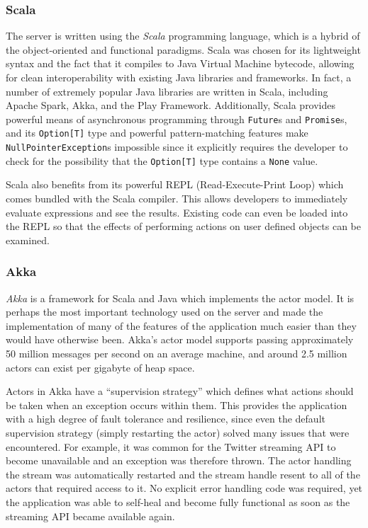 \documentclass{l4proj}
\newcommand{\code}[1]{\texttt{#1}}
\begin{document}
        \subsubsection{Scala}
        The server is written using the \textit{Scala} programming language, which is a hybrid of the object-oriented and functional paradigms. Scala was chosen for its lightweight syntax and the fact that it compiles to Java Virtual Machine bytecode, allowing for clean interoperability with existing Java libraries and frameworks. In fact, a number of extremely popular Java libraries are written in Scala, including Apache Spark, Akka, and the Play Framework. Additionally, Scala provides powerful means of asynchronous programming through \code{Future}s and \code{Promise}s, and its \code{Option[T]} type and powerful pattern-matching features make \code{NullPointerException}s impossible since it explicitly requires the developer to check for the possibility that the \code{Option[T]} type contains a \code{None} value.
        
Scala also benefits from its powerful REPL (Read-Execute-Print Loop) which comes bundled with the Scala compiler. This allows developers to immediately evaluate expressions and see the results. Existing code can even be loaded into the REPL so that the effects of performing actions on user defined objects can be examined.
        
        \subsubsection{Akka}
        \textit{Akka} is a framework for Scala and Java which implements the actor model. It is perhaps the most important technology used on the server and made the implementation of many of the features of the application much easier than they would have otherwise been. Akka's actor model supports passing approximately 50 million messages per second on an average machine, and around 2.5 million actors can exist per gigabyte of heap space.
        
        
        Actors in Akka have a “supervision strategy” which defines what actions should be taken when an exception occurs within them. This provides the application with a high degree of fault tolerance and resilience, since even the default supervision strategy (simply restarting the actor) solved many issues that were encountered. For example, it was common for the Twitter streaming API to become unavailable and an exception was therefore thrown. The actor handling the stream was automatically restarted and the stream handle resent to all of the actors that required access to it. No explicit error handling code was required, yet the application was able to self-heal and become fully functional as soon as the streaming API became available again.
        
\end{document}
